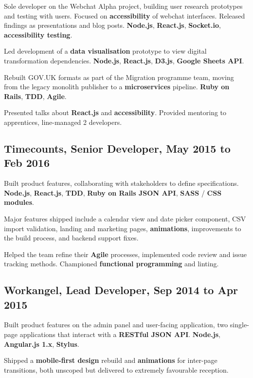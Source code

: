 \documentclass{article}
\begin{document}
Sole developer on the Webchat Alpha project, building user research prototypes
and testing with users. Focused on \textbf{accessibility} of webchat interfaces.
Released findings as presentations and blog posts. \textbf{Node.js},
\textbf{React.js}, \textbf{Socket.io}, \textbf{accessibility testing}.

Led development of a \textbf{data visualisation} prototype to view digital
transformation dependencies. \textbf{Node.js}, \textbf{React.js},
\textbf{D3.js}, \textbf{Google Sheets API}.

Rebuilt GOV.UK formats as part of the Migration programme team, moving from the
legacy monolith publisher to a \textbf{microservices} pipeline. \textbf{Ruby on
Rails}, \textbf{TDD}, \textbf{Agile}.

Presented talks about \textbf{React.js} and \textbf{accessibility}. Provided
mentoring to apprentices, line-managed 2 developers.

\subsection*{Timecounts, Senior Developer, May 2015 to Feb 2016}

Built product features, collaborating with stakeholders to define
specifications. \textbf{Node.js}, \textbf{React.js}, \textbf{TDD}, \textbf{Ruby
on Rails JSON API}, \textbf{SASS} / \textbf{CSS modules}.

Major features shipped include a calendar view and date picker component, CSV
import validation, landing and marketing pages, \textbf{animations},
improvements to the build process, and backend support fixes.

Helped the team refine their \textbf{Agile} processes, implemented code review
and issue tracking methods. Championed \textbf{functional programming} and
linting.

\subsection*{Workangel, Lead Developer, Sep 2014 to Apr 2015}

Built product features on the admin panel and user-facing application, two
single-page applications that interact with a \textbf{RESTful JSON API}.
\textbf{Node.js}, \textbf{Angular.js 1.x}, \textbf{Stylus}.

Shipped a \textbf{mobile-first design} rebuild and \textbf{animations} for
inter-page transitions, both unscoped but delivered to extremely favourable
reception.
\end{document}
